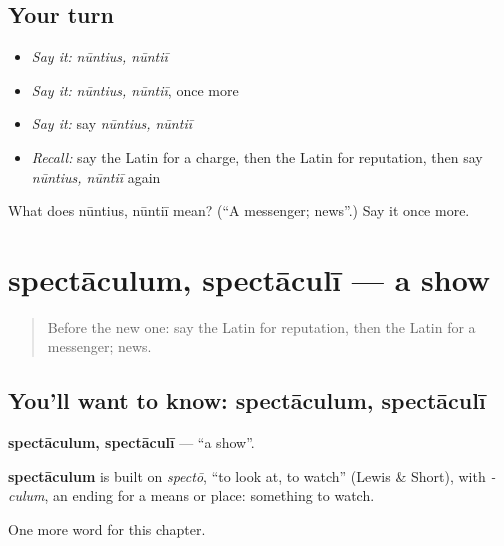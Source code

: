 \subsection*{Your turn}
\begin{itemize}
\raggedright
  \item \emph{Say it:} \emph{nūntius, nūntiī}
  \item \emph{Say it:} \emph{nūntius, nūntiī}, once more
  \item \emph{Say it:} say \emph{nūntius, nūntiī}
  \item \emph{Recall:} say the Latin for a charge, then the Latin for reputation, then say \emph{nūntius, nūntiī} again
\end{itemize}

\begin{tcolorbox}[breakable,colback=teal!4,colframe=teal!35!black,title={Before you move on}]
What does nūntius, nūntiī mean? (\textquotedblleft{}A messenger; news\textquotedblright{}.) Say it once more.
\end{tcolorbox}
\section[spectāculum, spectāculī]{spectāculum, spectāculī — a show}

\label{lesson:LA-C219-spectaculum}



\begin{quote}
Before the new one: say the Latin for reputation, then the Latin for a messenger; news.
\end{quote}

\subsection*{You'll want to know: spectāculum, spectāculī}
\textbf{spectāculum, spectāculī} — \textquotedblleft{}a show\textquotedblright{}.

\begin{cousinweb}
\textbf{spectāculum} is built on \emph{spectō}, \textquotedblleft{}to look at, to watch\textquotedblright{} (Lewis \& Short), with \emph{-culum}, an ending for a means or place: something to watch.
\end{cousinweb}

\begin{grammarlens}[title={What you've built}]
One more word for this chapter.
\end{grammarlens}

